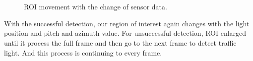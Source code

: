\begin{figure}[!ht]
\centering
{}\\
\\

\caption{ROI movement with the change of sensor data.}
\label{f:rec_mv}
\end{figure}


With the successful detection, our region of interest again changes with the light position and pitch and azimuth value.
For unsuccessful detection, ROI enlarged until it process the full frame and then go to the next frame to detect traffic light.
And this process is continuing to every frame.

